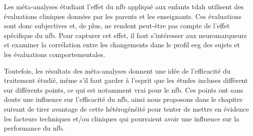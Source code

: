 Les méta-analyses étudiant l'effet du \gls{nfb} appliqué aux enfants \gls{tdah} utilisent des évaluations cliniques données par les parents et les enseignants.
Ces évaluations sont donc subjectives et, de plus, ne rendent peut-être pas compte de l'effet spécifique du \gls{nfb}. Pour capturer cet effet, il faut
s'intéresser aux neuromarqueurs et examiner la corrélation entre les changements dans le profil \gls{eeg} des sujets et les évaluations comportementales.

Toutefois, les résultats des méta-analyses donnent une idée de l'efficacité du traitement étudié, même s'il faut garder à l'esprit que les études incluses
diffèrent sur différents points, ce qui est notamment vrai pour le \gls{nfb}. Ces points ont sans doute une influence sur l'efficacité du \gls{nfb}, ainsi nous 
proposons dans le chapitre suivant de tirer avantage de cette hétérogénéité pour tenter de mettre en évidence les facteurs techniques et/ou cliniques qui
pourraient avoir une influence sur la performance du \gls{nfb}.

  